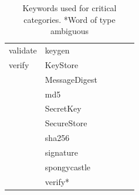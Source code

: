 \begin{table}[H]
\begin{tabular}{@{} l l l l l l @{}}
    validate       & keygen            &               &                &             & \\
    verify         & KeyStore          &               &                &             & \\
                  & MessageDigest     &               &                &             & \\
                  & md5               &               &                &             & \\
                  & SecretKey         &               &                &             & \\
                  & SecureStore       &               &                &             & \\
                  & sha256            &               &                &             & \\
                  & signature         &               &                &             & \\
                  & spongycastle      &               &                &             & \\ 
                  & verify*           &               &                &             & \\
\bottomrule
  \end{tabular}
  \caption{Keywords used for critical categories. *Word of type ambiguous}
  \label{tab:critical_regex_keywords}
\end{table}

